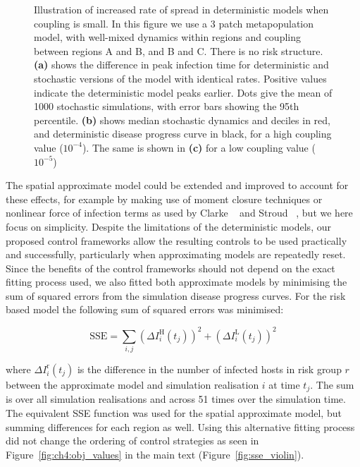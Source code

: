 \begin{figure}
    \begin{center}
        \caption[Time lags in deterministic and stochastic analogues]{Illustration of increased rate of spread in deterministic models when coupling is small. In this figure we use a 3 patch metapopulation model, with well-mixed dynamics within regions and coupling between regions A and B, and B and C. There is no risk structure. \textbf{(a)} shows the difference in peak infection time for deterministic and stochastic versions of the model with identical rates. Positive values indicate the deterministic model peaks earlier. Dots give the mean of 1000 stochastic simulations, with error bars showing the 95th percentile. \textbf{(b)} shows median stochastic dynamics and deciles in red, and deterministic disease progress curve in black, for a high coupling value ($10^{-4}$). The same is shown in \textbf{(c)} for a low coupling value ($10^{-5}$)}
        \label{fig:time_lag}
    \end{center}
\end{figure}

The spatial approximate model could be extended and improved to account for these effects, for example by making use of moment closure techniques \citep{keeling_effects_1999} or nonlinear force of infection terms \citep{roy_representing_2006} as used by Clarke \etal\ \citep{clarke_approximating_2013} and Stroud \etal\ \citep{stroud_semi-empirical_2006}, but we here focus on simplicity. Despite the limitations of the deterministic models, our proposed control frameworks allow the resulting controls to be used practically and successfully, particularly when approximating models are repeatedly reset. Since the benefits of the control frameworks should not depend on the exact fitting process used, we also fitted both approximate models by minimising the sum of squared errors from the simulation disease progress curves. For the risk based model the following sum of squared errors was minimised:
\begin{linenomath*}
\begin{equation}
    \mathrm{SSE} = \sum_{i,j}\left(\Delta{}I_i^\mathrm{H}(t_j)\right)^2 + \left(\Delta{}I_i^\mathrm{L}(t_j)\right)^2
\end{equation}
\end{linenomath*}
where $\Delta{}I_i^\mathrm{r}(t_j)$ is the difference in the number of infected hosts in risk group $r$ between the approximate model and simulation realisation $i$ at time $t_j$. The sum is over all simulation realisations and across 51 times over the simulation time. The equivalent SSE function was used for the spatial approximate model, but summing differences for each region as well. Using this alternative fitting process did not change the ordering of control strategies as seen in Figure~\ref{fig:ch4:obj_values} in the main text (Figure~\ref{fig:sse_violin}).

